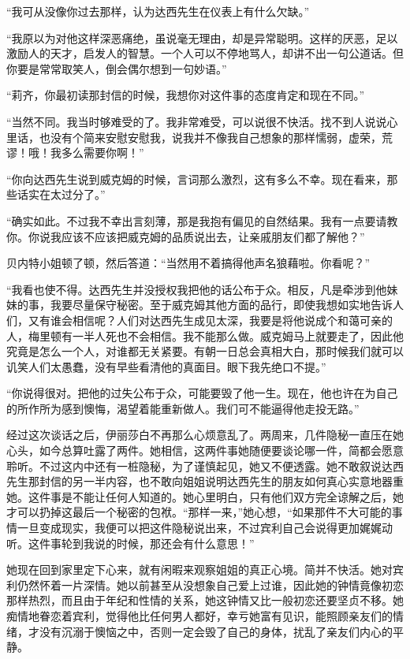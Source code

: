 \par “我可从没像你过去那样，认为达西先生在仪表上有什么欠缺。”
\par “我原以为对他这样深恶痛绝，虽说毫无理由，却是异常聪明。这样的厌恶，足以激励人的天才，启发人的智慧。一个人可以不停地骂人，却讲不出一句公道话。但你要是常常取笑人，倒会偶尔想到一句妙语。”
\par “莉齐，你最初读那封信的时候，我想你对这件事的态度肯定和现在不同。”
\par “当然不同。我当时够难受的了。我非常难受，可以说很不快活。找不到人说说心里话，也没有个简来安慰安慰我，说我并不像我自己想象的那样懦弱，虚荣，荒谬！哦！我多么需要你啊！”
\par “你向达西先生说到威克姆的时候，言词那么激烈，这有多么不幸。现在看来，那些话实在太过分了。”
\par “确实如此。不过我不幸出言刻薄，那是我抱有偏见的自然结果。我有一点要请教你。你说我应该不应该把威克姆的品质说出去，让亲戚朋友们都了解他？”
\par 贝内特小姐顿了顿，然后答道：“当然用不着搞得他声名狼藉啦。你看呢？”
\par “我看也使不得。达西先生并没授权我把他的话公布于众。相反，凡是牵涉到他妹妹的事，我要尽量保守秘密。至于威克姆其他方面的品行，即使我想如实地告诉人们，又有谁会相信呢？人们对达西先生成见太深，我要是将他说成个和蔼可亲的人，梅里顿有一半人死也不会相信。我不能那么做。威克姆马上就要走了，因此他究竟是怎么一个人，对谁都无关紧要。有朝一日总会真相大白，那时候我们就可以讥笑人们太愚蠢，没有早些看清他的真面目。眼下我先绝口不提。”
\par “你说得很对。把他的过失公布于众，可能要毁了他一生。现在，他也许在为自己的所作所为感到懊悔，渴望着能重新做人。我们可不能逼得他走投无路。”
\par 经过这次谈话之后，伊丽莎白不再那么心烦意乱了。两周来，几件隐秘一直压在她心头，如今总算吐露了两件。她相信，这两件事她随便要谈论哪一件，简都会愿意聆听。不过这内中还有一桩隐秘，为了谨慎起见，她又不便透露。她不敢叙说达西先生那封信的另一半内容，也不敢向姐姐说明达西先生的朋友如何真心实意地器重她。这件事是不能让任何人知道的。她心里明白，只有他们双方完全谅解之后，她才可以扔掉这最后一个秘密的包袱。“那样一来，”她心想，“如果那件不大可能的事情一旦变成现实，我便可以把这件隐秘说出来，不过宾利自己会说得更加娓娓动听。这件事轮到我说的时候，那还会有什么意思！”
\par 她现在回到家里定下心来，就有闲暇来观察姐姐的真正心境。简并不快活。她对宾利仍然怀着一片深情。她以前甚至从没想象自己爱上过谁，因此她的钟情竟像初恋那样热烈，而且由于年纪和性情的关系，她这钟情又比一般初恋还要坚贞不移。她痴情地眷恋着宾利，觉得他比任何男人都好，幸亏她富有见识，能照顾亲友们的情绪，才没有沉溺于懊恼之中，否则一定会毁了自己的身体，扰乱了亲友们内心的平静。
